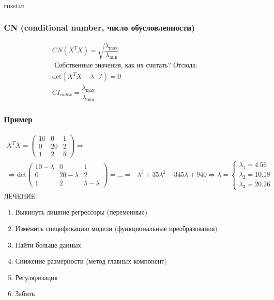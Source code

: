 \documentclass{article}
\begin{document}
\begin{otherlanguage*}{russian}
\subsubsection*{CN (conditional number, число обусловленности)}
\begin{align*}
CN(X^T X) = \sqrt{\dfrac{\lambda_{\max}}{\lambda_{\min}}} \\
\text{ Собственные значения, как их считать? Отсюда: } \\
\text{det} (X^T  X - \lambda \cdot \mathcal{I} ) = 0  \\
CI_{index} = \dfrac{\lambda_{\max}}{\lambda_{\min}} 
\end{align*}
\subsubsection*{Пример}
\begin{align*}
X^T X = \begin{pmatrix}
10 & 0 & 1 \\
0 & 20 & 2 \\
1 &  2 & 5
\end{pmatrix} \Rightarrow \\
\Rightarrow \text{det} \begin{pmatrix}
10 - \lambda & 0 & 1 \\
0 & 20 - \lambda & 2 \\
1 & 2 & 5 - \lambda 
\end{pmatrix} = \ldots = - \lambda ^ 3 + 35 \lambda ^ 2 - 345 \lambda + 940 \Rightarrow
\lambda  = \begin{cases}
\lambda_1 = 4.56 \\
\lambda_2 = 10.18 \\
\lambda_3 = 20.26
\end{cases}
\end{align*}
ЛЕЧЕНИЕ: 
\begin{enumerate}
\item Выкинуть лишние регрессоры (переменные) 
\item Изменить спецификацию модели (функциональные преобразования) 
\item Найти больше данных 
\item Снижение размерности (метод главных компонент) 
\item Регуляризация 
\item Забить
\end{enumerate}
\end{otherlanguage*} 
\end{document}
